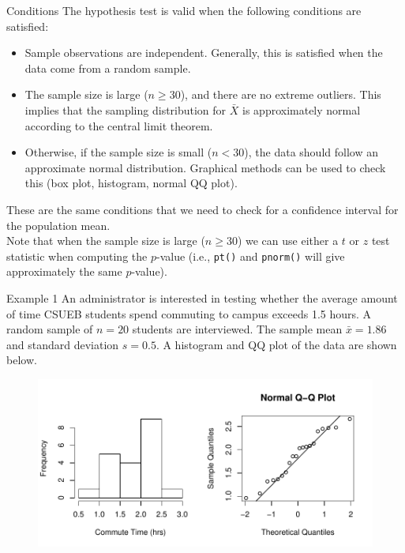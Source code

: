 \documentclass[fleqn, 10pt]{beamer}\usepackage[]{graphicx}\usepackage[]{color}
\begin{document}
\begin{frame}{Conditions}
The hypothesis test is valid when the following conditions are satisfied:
\vspace{5pt}
\begin{itemize}
\item Sample observations are independent. Generally, this is satisfied when the data come from a random sample.
\item The sample size is large ($n \geq 30$), and there are no extreme outliers.  This implies that the sampling distribution for $\bar{X}$ is approximately normal according to the central limit theorem.
\item Otherwise, if the sample size is small ($n < 30$), the data should follow an approximate normal distribution. Graphical methods can be used to check this (box plot, histogram, normal QQ plot).\\
\end{itemize}
\vspace{3pt}
These are the same conditions that we need to check for a confidence interval for the population mean.\\

\bigskip
Note that when the sample size is large ($n \geq 30$) we can use either a $t$ or $z$ test statistic when computing the $p$-value (i.e., \texttt{pt()} and \texttt{pnorm()} will give approximately the same $p$-value).
\end{frame}

\begin{frame}{Example 1}
An administrator is interested in testing whether the average amount of time CSUEB students spend commuting to campus exceeds 1.5 hours.  A random sample of $n=20$ students are interviewed.  The sample mean $\bar{x} = 1.86$ and standard deviation $s=0.5$.  A histogram and QQ plot of the data are shown below.\\
\begin{figure}
\includegraphics[scale=0.6]{figure/ex1.pdf}
\end{figure}
\end{frame}
\end{document}
